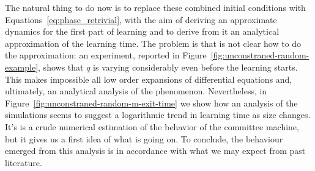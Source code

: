 The natural thing to do now is to replace these combined initial conditions with Equations~\eqref{eq:phase_retrivial},
with the aim of deriving an approximate dynamics for the first part of learning
and to derive from it an analytical approximation of the learning time.
The problem is that is not clear how to do the approximation: an experiment, reported in Figure~\ref{fig:unconstraned-random-example},
shows that \(q\) is varying considerably even before the learning starts.
This makes impossible all low order expansions of differential equations and,
ultimately, an analytical analysis of the phenomenon.
Nevertheless, in Figure~\ref{fig:unconstraned-random-m-exit-time} we show how an analysis of the simulations seems to suggest
a logarithmic trend in learning time as size changes. It's is a crude numerical estimation of the behavior of the committee machine,
but it gives us a first idea of what is going on. To conclude, the behaviour emerged from this analysis
is in accordance with what we may expect from past literature\cite{arous2021online}.
